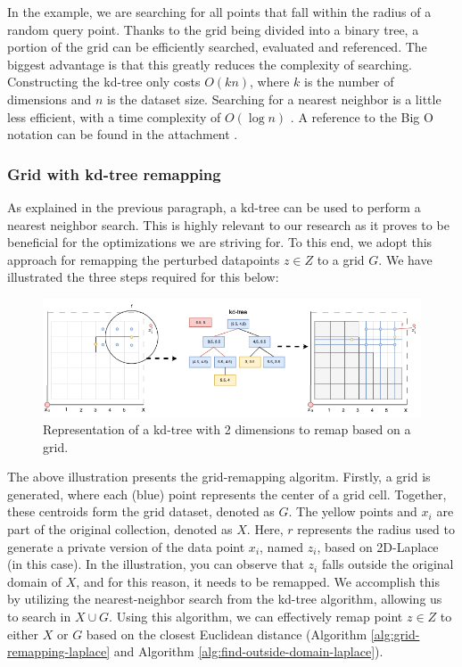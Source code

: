 In the example, we are searching for all points that fall within the radius of a random query point.
Thanks to the grid being divided into a binary tree, a portion of the grid can be efficiently searched, evaluated and referenced.
The biggest advantage is that this greatly reduces the complexity of searching.
Constructing the kd-tree only costs $O(kn)$, where $k$ is the number of dimensions and $n$ is the dataset size.
Searching for a nearest neighbor is a little less efficient, with a time complexity of $O(\log n)$ \citep{washington_k-d_2002}.
A reference to the Big O notation can be found in the attachment .
\subsubsection{Grid with kd-tree remapping} \label{theory:grid-remapping}
As explained in the previous paragraph, a kd-tree can be used to perform a nearest neighbor search.
This is highly relevant to our research as it proves to be beneficial for the optimizations we are striving for.
To this end, we adopt this approach for remapping the perturbed datapoints $z \in Z$ to a grid $G$. \newline
We have illustrated the three steps required for this below:
\begin{figure}[H]
  \includegraphics[width=1\textwidth]{TheorethicalFramework/ND-Laplace/Images/KD-tree.png}
  \caption{Representation of a kd-tree with 2 dimensions to remap based on a grid.}
  \label{fig:kd-tree}
\end{figure}
The above illustration presents the grid-remapping algoritm.
Firstly, a grid is generated, where each (blue) point represents the center of a grid cell.
Together, these centroids form the grid dataset, denoted as $G$.
The yellow points and $x_i$ are part of the original collection, denoted as $X$.
Here, $r$ represents the radius used to generate a private version of the data point $x_i$, named $z_i$, based on 2D-Laplace (in this case).
In the illustration, you can observe that $z_i$ falls outside the original domain of $X$, and for this reason, it needs to be remapped.
We accomplish this by utilizing the nearest-neighbor search from the kd-tree algorithm, allowing us to search in $X \cup G$.
Using this algorithm, we can effectively remap point $z \in Z$ to either $X$ or $G$ based on the closest Euclidean distance (Algorithm \ref{alg:grid-remapping-laplace} and Algorithm \ref{alg:find-outside-domain-laplace}).

